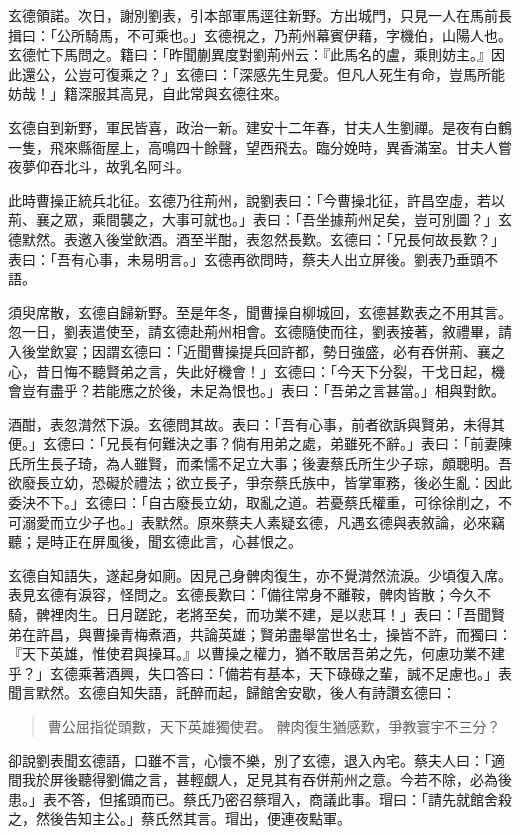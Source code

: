 玄德領諾。次日，謝別劉表，引本部軍馬逕往新野。方出城門，只見一人在馬前長揖曰：「公所騎馬，不可乘也。」玄德視之，乃荊州幕賓伊藉，字機伯，山陽人也。玄德忙下馬問之。籍曰：「昨聞蒯異度對劉荊州云：『此馬名的盧，乘則妨主。』因此還公，公豈可復乘之？」玄德曰：「深感先生見愛。但凡人死生有命，豈馬所能妨哉！」籍深服其高見，自此常與玄德往來。

玄德自到新野，軍民皆喜，政治一新。建安十二年春，甘夫人生劉禪。是夜有白鶴一隻，飛來縣衙屋上，高鳴四十餘聲，望西飛去。臨分娩時，異香滿室。甘夫人嘗夜夢仰吞北斗，故乳名阿斗。

此時曹操正統兵北征。玄德乃往荊州，說劉表曰：「今曹操北征，許昌空虛，若以荊、襄之眾，乘間襲之，大事可就也。」表曰：「吾坐據荊州足矣，豈可別圖？」玄德默然。表邀入後堂飲酒。酒至半酣，表忽然長歎。玄德曰：「兄長何故長歎？」表曰：「吾有心事，未易明言。」玄德再欲問時，蔡夫人出立屏後。劉表乃垂頭不語。

須臾席散，玄德自歸新野。至是年冬，聞曹操自柳城回，玄德甚歎表之不用其言。忽一日，劉表遣使至，請玄德赴荊州相會。玄德隨使而往，劉表接著，敘禮畢，請入後堂飲宴；因謂玄德曰：「近聞曹操提兵回許都，勢日強盛，必有吞併荊、襄之心，昔日悔不聽賢弟之言，失此好機會！」玄德曰：「今天下分裂，干戈日起，機會豈有盡乎？若能應之於後，未足為恨也。」表曰：「吾弟之言甚當。」相與對飲。

酒酣，表忽潸然下淚。玄德問其故。表曰：「吾有心事，前者欲訴與賢弟，未得其便。」玄德曰：「兄長有何難決之事？倘有用弟之處，弟雖死不辭。」表曰：「前妻陳氏所生長子琦，為人雖賢，而柔懦不足立大事；後妻蔡氏所生少子琮，頗聰明。吾欲廢長立幼，恐礙於禮法；欲立長子，爭奈蔡氏族中，皆掌軍務，後必生亂：因此委決不下。」玄德曰：「自古廢長立幼，取亂之道。若憂蔡氏權重，可徐徐削之，不可溺愛而立少子也。」表默然。原來蔡夫人素疑玄德，凡遇玄德與表敘論，必來竊聽；是時正在屏風後，聞玄德此言，心甚恨之。

玄德自知語失，遂起身如廁。因見己身髀肉復生，亦不覺潸然流淚。少頃復入席。表見玄德有淚容，怪問之。玄德長歎曰：「備往常身不離鞍，髀肉皆散；今久不騎，髀裡肉生。日月蹉跎，老將至矣，而功業不建，是以悲耳！」表曰：「吾聞賢弟在許昌，與曹操青梅煮酒，共論英雄；賢弟盡舉當世名士，操皆不許，而獨曰：『天下英雄，惟使君與操耳。』以曹操之權力，猶不敢居吾弟之先，何慮功業不建乎？」玄德乘著酒興，失口答曰：「備若有基本，天下碌碌之輩，誠不足慮也。」表聞言默然。玄德自知失語，託醉而起，歸館舍安歇，後人有詩讚玄德曰：

\begin{quote}
曹公屈指從頭數，天下英雄獨使君。
髀肉復生猶感歎，爭教寰宇不三分？
\end{quote}

卻說劉表聞玄德語，口雖不言，心懷不樂，別了玄德，退入內宅。蔡夫人曰：「適間我於屏後聽得劉備之言，甚輕覷人，足見其有吞併荊州之意。今若不除，必為後患。」表不答，但搖頭而已。蔡氏乃密召蔡瑁入，商議此事。瑁曰：「請先就館舍殺之，然後告知主公。」蔡氏然其言。瑁出，便連夜點軍。

